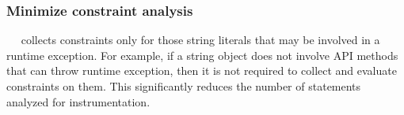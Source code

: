 
\subsubsection{Minimize constraint analysis}
\label{subsubsec:minimizeConstrintInstrumentation}
~\newline
\tool\ collects constraints only for those string literals that may be involved
in a runtime exception. For example, if a string object does not involve API
methods that can throw runtime exception, then it is not required to collect and
evaluate constraints on them. This significantly reduces the number of
statements analyzed for instrumentation.
 


